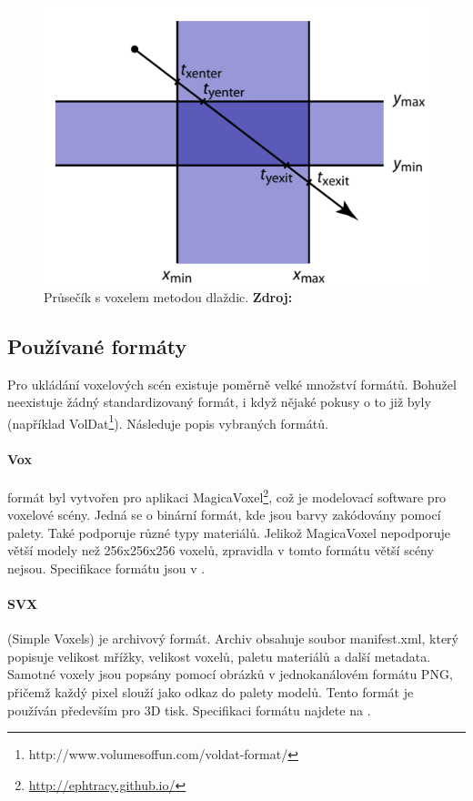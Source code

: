 \begin{figure}[H]
    \centering
    \includegraphics[scale=1.3]{obrazky-figures/slab_intersect.png}
    \caption{Průsečík s voxelem metodou dlaždic. \textbf{Zdroj: \cite{Cunha13}}}
    \label{fig:slabs}
\end{figure}


\subsection{Používané formáty}
Pro ukládání voxelových scén existuje poměrně velké množství formátů. Bohužel neexistuje žádný standardizovaný formát, i když nějaké pokusy o to již byly (například VolDat\footnote{http://www.volumesoffun.com/voldat-format/}). Následuje popis vybraných formátů.

\paragraph{Vox} formát byl vytvořen pro aplikaci MagicaVoxel\footnote{\url{http://ephtracy.github.io/}}, což je modelovací software pro voxelové scény. Jedná se o binární formát, kde jsou barvy zakódovány pomocí palety. Také podporuje různé typy materiálů. Jelikož MagicaVoxel nepodporuje větší modely než 256x256x256 voxelů, zpravidla v tomto formátu větší scény nejsou. Specifikace formátu jsou v \cite{vox_format}.

\paragraph{SVX} (Simple Voxels) je archivový formát. Archiv obsahuje soubor manifest.xml, který popisuje velikost mřížky, velikost voxelů, paletu materiálů a další metadata. Samotné voxely jsou popsány pomocí obrázků v jednokanálovém formátu PNG, přičemž každý pixel slouží jako odkaz do palety modelů. Tento formát je používán především pro 3D tisk. Specifikaci formátu najdete na \cite{svx_format_2014}.

